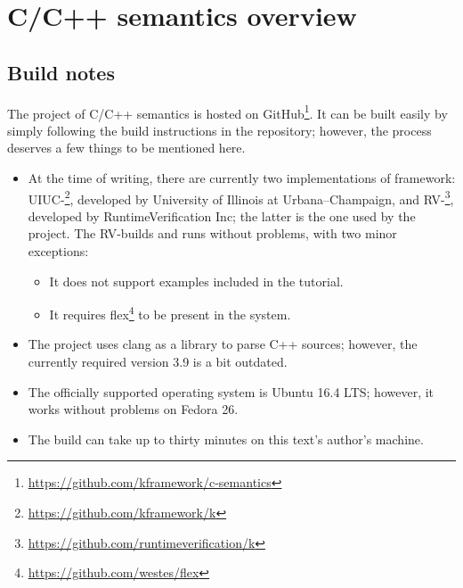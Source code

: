 \documentclass{fithesis3}
\begin{document}


\chapter{\K C/C++ semantics overview}





\section{Build notes}
The project of \K C/C++ semantics is hosted on GitHub\footnote{\url{https://github.com/kframework/c-semantics}}. It can be built easily by simply following the build instructions in the repository; however, the process deserves a few things to be mentioned here.

\begin{itemize}
\item At the time of writing, there are currently two implementations of \K framework: UIUC-\K\footnote{\url{https://github.com/kframework/k}}, developed by University of Illinois at Urbana–Champaign, and RV-\K\footnote{\url{https://github.com/runtimeverification/k}}, developed by RuntimeVerification Inc; the latter is the one used by the project. The RV-\K builds and runs without problems, with two minor exceptions:
\begin{itemize}
\item It does not support examples included in the \K tutorial.
\item It requires flex\footnote{\url{https://github.com/westes/flex}} to be present in the system.
\end{itemize}
\item The project uses clang as a library to parse C++ sources; however, the currently required version 3.9 is a bit outdated.
\item The officially supported operating system is Ubuntu 16.4 LTS; however, it works without problems on Fedora 26.
\item The build can take up to thirty minutes on this text's author's machine.
\end{itemize}
\end{document}
